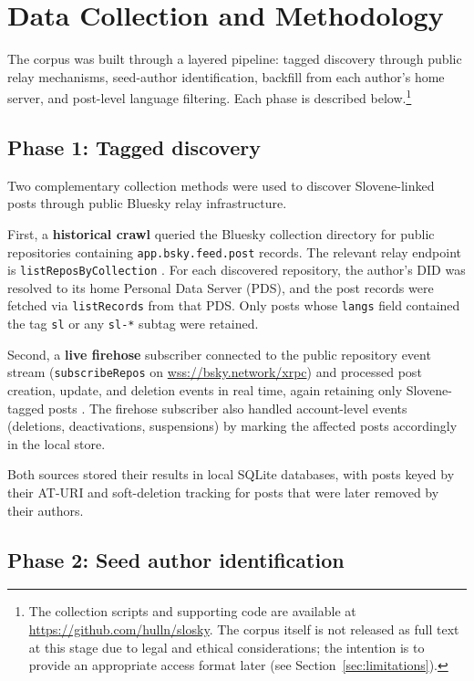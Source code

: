 \section{Data Collection and Methodology}
\label{sec:corpus-construction}

The corpus was built through a layered pipeline: tagged discovery through public relay mechanisms, seed-author identification, backfill from each author's home server, and post-level language filtering. Each phase is described below.\footnote{The collection scripts and supporting code are available at \url{https://github.com/hulln/slosky}. The corpus itself is not released as full text at this stage due to legal and ethical considerations; the intention is to provide an appropriate access format later (see Section~\ref{sec:limitations}).}

\subsection{Phase 1: Tagged discovery}

Two complementary collection methods were used to discover Slovene-linked posts through public Bluesky relay infrastructure.

First, a \textbf{historical crawl} queried the Bluesky collection directory for public repositories containing \texttt{app.bsky.feed.post} records. The relevant relay endpoint is \texttt{listReposByCollection} \parencite{atproto-sync,bsky-listreposbycollection}. For each discovered repository, the author's DID was resolved to its home Personal Data Server (PDS), and the post records were fetched via \texttt{listRecords} from that PDS. Only posts whose \texttt{langs} field contained the tag \texttt{sl} or any \texttt{sl-*} subtag were retained.

Second, a \textbf{live firehose} subscriber connected to the public repository event stream (\texttt{subscribeRepos} on \url{wss://bsky.network/xrpc}) and processed post creation, update, and deletion events in real time, again retaining only Slovene-tagged posts \parencite{atproto-streaming}. The firehose subscriber also handled account-level events (deletions, deactivations, suspensions) by marking the affected posts accordingly in the local store.

Both sources stored their results in local SQLite databases, with posts keyed by their AT-URI and soft-deletion tracking for posts that were later removed by their authors.

\subsection{Phase 2: Seed author identification}

